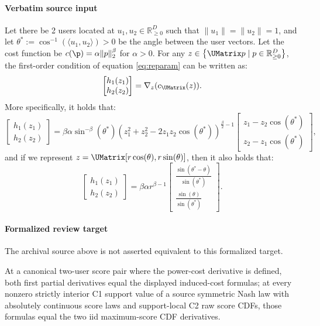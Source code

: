 \documentclass[10pt]{article}
\begin{document}
\paragraph{Verbatim source input}
\begin{ReviewVerbatim}
\begin{lemma}
\label{lemma:FOC}
Let there be 2 users located at $u_1, u_2 \in \mathbb{R}_{\ge 0}^D$ such that  $\|u_1\| = \|u_2\| = 1$, and let $\theta^* := \cos^{-1}\left( \langle u_1, u_2\rangle \right) > 0$ be the angle between the user vectors. Let the cost function be $c(\p) = \alpha \|p\|_2^{\beta}$ for $\alpha > 0$. For any $z \in \left\{\UMatrix p \mid p \in \mathbb{R}_{\ge 0}^D \right\}$, the first-order condition of equation \eqref{eq:reparam} can be written as:
\[\begin{bmatrix}
h_1(z_1) \\
h_2(z_2)
\end{bmatrix}
= \nabla_{z}(c_{\UMatrix}(z)).\]
More specifically, it holds that:
\[\begin{bmatrix}
h_1(z_1) \\
h_2(z_2)
\end{bmatrix} = \beta \alpha \sin^{-\beta}(\theta^*) \left(z_1^2 + z_2^2 - 2 z_1 z_2 \cos(\theta^*) \right)^{\frac{\beta}{2} - 1} \begin{bmatrix}
z_1 - z_2 \cos(\theta^*) \\
z_2 - z_1 \cos(\theta^*)
\end{bmatrix},
\]
and if we represent $z = \UMatrix [r\cos(\theta), r \sin(\theta)]$, then it also holds that:
\[\begin{bmatrix}
h_1(z_1) \\
h_2(z_2)
\end{bmatrix}  = \beta \alpha r^{\beta - 1} \begin{bmatrix}
\frac{\sin(\theta^* - \theta)}{\sin(\theta^*)} \\
\frac{\sin(\theta)}{\sin(\theta^*)}
\end{bmatrix}.   \]
\end{lemma}
\end{ReviewVerbatim}


\paragraph{Formalized review target}
The archival source above is not asserted equivalent to this formalized target.
\begin{ReviewVerbatim}
At a canonical two-user score pair where the power-cost derivative is defined, both first partial derivatives equal the displayed induced-cost formulas; at every nonzero strictly interior C1 support value of a source symmetric Nash law with absolutely continuous score laws and support-local C2 raw score CDFs, those formulas equal the two iid maximum-score CDF derivatives.
\end{ReviewVerbatim}
\end{document}
